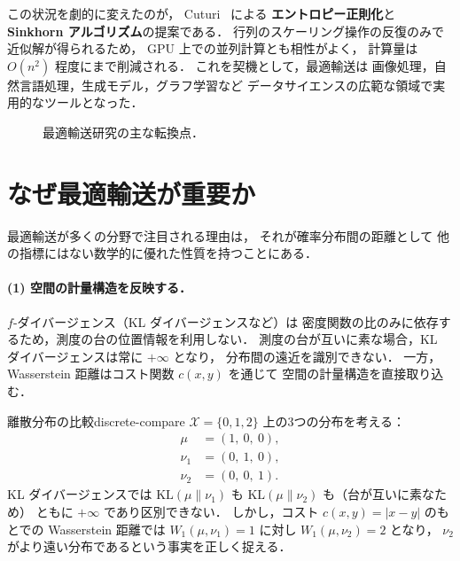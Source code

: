 この状況を劇的に変えたのが，
Cuturi~\cite{Cuturi2013} による
\textbf{エントロピー正則化}と \textbf{Sinkhorn アルゴリズム}の提案である．
行列のスケーリング操作の反復のみで近似解が得られるため，
GPU 上での並列計算とも相性がよく，
計算量は $O(n^2)$ 程度にまで削減される．
これを契機として，最適輸送は
画像処理，自然言語処理，生成モデル，グラフ学習など
データサイエンスの広範な領域で実用的なツールとなった．

\begin{figure}[htbp]
\centering
{}
\caption{最適輸送研究の主な転換点．}
\label{fig:timeline}
\end{figure}


\section{なぜ最適輸送が重要か}\label{sec:why-ot}

最適輸送が多くの分野で注目される理由は，
それが確率分布間の距離として
他の指標にはない数学的に優れた性質を持つことにある．

\paragraph{(1) 空間の計量構造を反映する．}
$f$-ダイバージェンス（KL ダイバージェンスなど）は
密度関数の比のみに依存するため，測度の台の位置情報を利用しない．
測度の台が互いに素な場合，KL ダイバージェンスは常に $+\infty$ となり，
分布間の遠近を識別できない．
一方，Wasserstein 距離はコスト関数 $c(x, y)$ を通じて
空間の計量構造を直接取り込む．

\begin{example}{離散分布の比較}{discrete-compare}
$\mathcal{X} = \{0, 1, 2\}$ 上の3つの分布を考える：
\begin{align*}
  \mu &= (1,\ 0,\ 0), \\
  \nu_1 &= (0,\ 1,\ 0), \\
  \nu_2 &= (0,\ 0,\ 1).
\end{align*}
KL ダイバージェンスでは $\mathrm{KL}(\mu \| \nu_1)$
も $\mathrm{KL}(\mu \| \nu_2)$ も（台が互いに素なため）
ともに $+\infty$ であり区別できない．
しかし，コスト $c(x,y) = |x - y|$ のもとでの
Wasserstein 距離では $W_1(\mu, \nu_1) = 1$ に対し
$W_1(\mu, \nu_2) = 2$ となり，
$\nu_2$ がより遠い分布であるという事実を正しく捉える．
\end{example}

